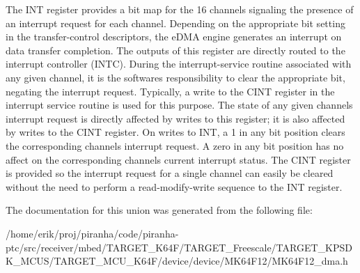The I\+NT register provides a bit map for the 16 channels signaling the presence of an interrupt request for each channel. Depending on the appropriate bit setting in the transfer-\/control descriptors, the e\+D\+MA engine generates an interrupt on data transfer completion. The outputs of this register are directly routed to the interrupt controller (I\+N\+TC). During the interrupt-\/service routine associated with any given channel, it is the software\textquotesingle{}s responsibility to clear the appropriate bit, negating the interrupt request. Typically, a write to the C\+I\+NT register in the interrupt service routine is used for this purpose. The state of any given channel\textquotesingle{}s interrupt request is directly affected by writes to this register; it is also affected by writes to the C\+I\+NT register. On writes to I\+NT, a 1 in any bit position clears the corresponding channel\textquotesingle{}s interrupt request. A zero in any bit position has no affect on the corresponding channel\textquotesingle{}s current interrupt status. The C\+I\+NT register is provided so the interrupt request for a single channel can easily be cleared without the need to perform a read-\/modify-\/write sequence to the I\+NT register. 

The documentation for this union was generated from the following file\+:\begin{DoxyCompactItemize}
\item 
/home/erik/proj/piranha/code/piranha-\/ptc/src/receiver/mbed/\+T\+A\+R\+G\+E\+T\+\_\+\+K64\+F/\+T\+A\+R\+G\+E\+T\+\_\+\+Freescale/\+T\+A\+R\+G\+E\+T\+\_\+\+K\+P\+S\+D\+K\+\_\+\+M\+C\+U\+S/\+T\+A\+R\+G\+E\+T\+\_\+\+M\+C\+U\+\_\+\+K64\+F/device/device/\+M\+K64\+F12/M\+K64\+F12\+\_\+dma.\+h\end{DoxyCompactItemize}
